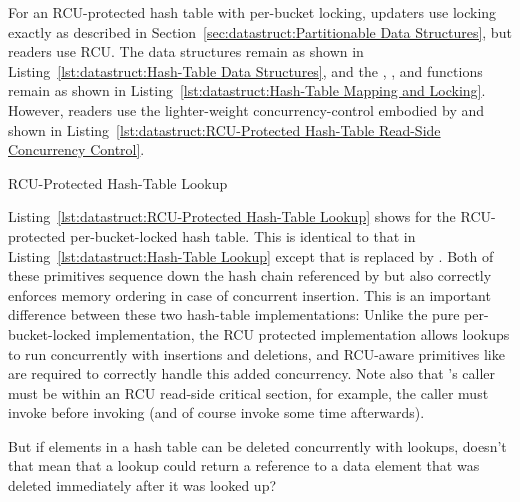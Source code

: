 For an RCU-protected hash table with per-bucket locking,
updaters use locking exactly as described in
Section~\ref{sec:datastruct:Partitionable Data Structures},
but readers use RCU.
The data structures remain as shown in
Listing~\ref{lst:datastruct:Hash-Table Data Structures},
and the , , and 
functions remain as shown in
Listing~\ref{lst:datastruct:Hash-Table Mapping and Locking}.
However, readers use the lighter-weight concurrency-control embodied
by  and 
shown in
Listing~\ref{lst:datastruct:RCU-Protected Hash-Table Read-Side Concurrency Control}.

\begin{listing}[tb]

\caption{RCU-Protected Hash-Table Lookup}
\label{lst:datastruct:RCU-Protected Hash-Table Lookup}
\end{listing}

Listing~\ref{lst:datastruct:RCU-Protected Hash-Table Lookup}
shows  for the RCU-protected per-bucket-locked
hash table.
This is identical to that in
Listing~\ref{lst:datastruct:Hash-Table Lookup}
except that  is replaced
by .
Both of these primitives sequence down the hash chain referenced
by  but  also
correctly enforces memory ordering in case of concurrent insertion.
This is an important difference between these two hash-table implementations:
Unlike the pure per-bucket-locked implementation, the RCU protected
implementation allows lookups to run concurrently with insertions
and deletions, and RCU-aware primitives like
 are required to correctly handle
this added concurrency.
Note also that 's caller must be within an
RCU read-side critical section, for example, the caller must invoke
 before invoking 
(and of course invoke  some time afterwards).

\QuickQuiz{}
	But if elements in a hash table can be deleted concurrently
	with lookups, doesn't that mean that a lookup could return
	a reference to a data element that was deleted immediately
	after it was looked up?
 \QuickQuizEnd

